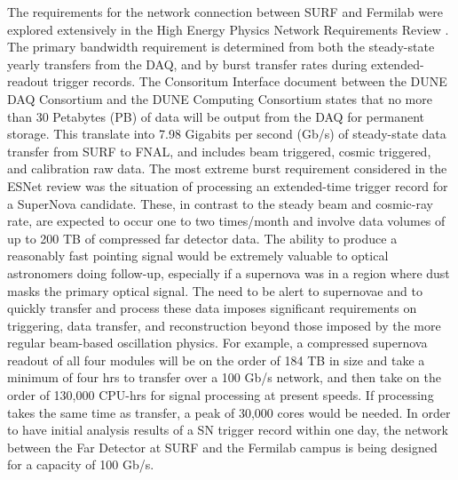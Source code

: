 \documentclass[../main-v1.tex]{subfiles}
\begin{document}
The requirements for the network connection between SURF and Fermilab were explored extensively in the High Energy Physics Network Requirements Review\cite{bib:osti_1804717} . The primary bandwidth requirement is determined from both the steady-state yearly transfers from the DAQ, and by burst transfer rates during extended-readout trigger records. The Consoritum Interface document between the DUNE DAQ Consortium and the DUNE Computing Consortium states that no more than 30 Petabytes (PB) of data will be output from the DAQ for permanent storage. This translate into 7.98 Gigabits per second (Gb/s) of steady-state data transfer from SURF to FNAL, and includes beam triggered, cosmic triggered, and calibration raw data. The most extreme burst requirement considered in the ESNet review was the situation of processing an extended-time trigger record for a SuperNova candidate. These, in contrast to the steady beam and cosmic-ray rate,
are expected to occur one to two times/month and involve data volumes of up to 200 TB of compressed far detector data. The ability to produce a reasonably fast pointing signal would be extremely valuable to optical astronomers doing follow-up, especially if a supernova was in a region where dust masks the primary optical signal. The need to be alert to supernovae and to quickly transfer and process these data imposes significant requirements on triggering, data transfer, and reconstruction beyond those imposed by the more regular beam-based oscillation physics. For example, a compressed supernova readout of all four modules will be on the order of 184 TB in size and take a minimum of four hrs to transfer over a 100 Gb/s network, and then take on the order of 130,000 CPU-hrs for signal processing at present speeds. If processing takes the same time as transfer, a peak of 30,000 cores would be needed. In order to have initial analysis results of a SN trigger record within one day, the network between the Far Detector at SURF and the Fermilab campus is being designed for a capacity of 100 Gb/s.
\end{document}
